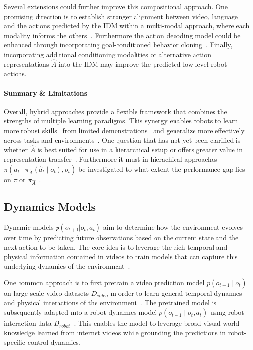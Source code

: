 Several extensions could further improve this compositional approach. One promising direction is to establish stronger alignment between video, language and the actions predicted by the \ac{IDM} within a multi-modal approach, where each modality informs the others~\cite{Ajay2023CompositionalFM}. Furthermore the action decoding model could be enhanced through incorporating goal-conditioned behavior cloning~\cite{Du2023VideoLP}. Finally, incorporating additional conditioning modalities or alternative action representations $\hat{A}$ into the \ac{IDM} may improve the predicted low-level robot actions.




\paragraph{Summary \& Limitations}
Overall, hybrid approaches provide a flexible framework that combines the strengths of multiple learning paradigms.
This synergy enables robots to learn more robust skills~\cite{Radosavovic2022RealWorldRL, Nair2022R3MAU, Parisi2022TheUE} from limited demonstrations~\cite{Nair2022R3MAU, Schmidt2023LearningTA, Ye2023ReinforcementLW} and generalize more effectively across tasks and environments~\cite{Du2023LearningUP, Wang2023MimicPlayLI, Black2023ZeroShotRM, Thomas2023PLEXMT, Zhao2022WhatMR, Lin2023SpawnNetLG}.
One question that has not yet been clarified is whether $\hat{A}$ is best suited for use in a hierarchical setup or offers greater value in representation transfer~\cite{McCarthy_2025}. Furthermore it must in hierachical approaches $\pi(a_t \mid \pi_{\hat{A}}(\hat{a}_t \mid o_t), o_t )$ be investigated to what extent the performance gap lies on $\pi$ or $\pi_{\hat{A}}$~\cite{McCarthy_2025}.





\subsection{Dynamics Models}
\label{sec:DynamicsModels}
Dynamic models $p(o_{t+1}|o_t, a_t)$ aim to determine how the environment evolves over time by predicting future observations based on the current state and the next action to be taken.
The core idea is to leverage the rich temporal and physical information contained in videos to train models that can capture this underlying dynamics of the environment~\cite{McCarthy_2025}.


One common approach is to first pretrain a video prediction model $p(o_{t+1} \mid o_t)$ on large-scale video datasets $D_{video}$ in order to learn general temporal dynamics and physical interactions of the environment~\cite{Yang2023LearningIR, Du2023LearningUP, Du2023VideoLP}. The pretrained model is subsequently adapted into a robot dynamics model $p(o_{t+1} \mid o_t, a_t)$ using robot interaction data $D_{robot}$~\cite{McCarthy_2025}.
This enables the model to leverage broad visual world knowledge learned from internet videos while grounding the predictions in robot-specific control dynamics.

